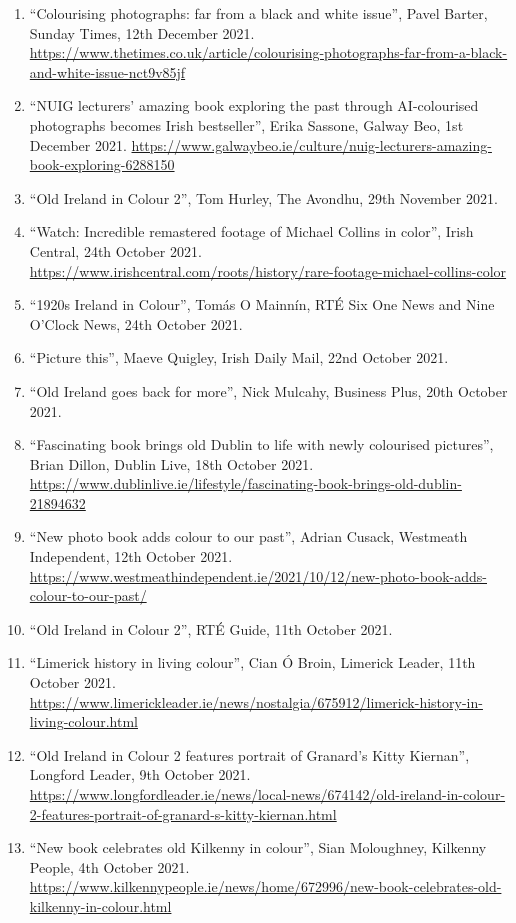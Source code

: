 \documentclass[10pt,a4paper]{res} %
\begin{document}
\begin{resume}
{\begin{enumerate}
\item ``Colourising photographs: far from a black and white issue'', Pavel Barter, Sunday Times, 12th December 2021. \url{https://www.thetimes.co.uk/article/colourising-photographs-far-from-a-black-and-white-issue-nct9v85jf}
\item ``NUIG lecturers' amazing book exploring the past through AI-colourised photographs becomes Irish bestseller'', Erika Sassone, Galway Beo, 1st December 2021. \url{https://www.galwaybeo.ie/culture/nuig-lecturers-amazing-book-exploring-6288150}
\item ``Old Ireland in Colour 2'', Tom Hurley, The Avondhu, 29th November 2021.
\item ``Watch: Incredible remastered footage of Michael Collins in color'', Irish Central, 24th October 2021. \url{https://www.irishcentral.com/roots/history/rare-footage-michael-collins-color}
\item ``1920s Ireland in Colour'', Tom\'{a}s O Mainn\'{i}n, RT\'{E} Six One News and Nine O'Clock News, 24th October 2021.
\item ``Picture this'', Maeve Quigley, Irish Daily Mail, 22nd October 2021.
\item ``Old Ireland goes back for more'', Nick Mulcahy, Business Plus, 20th October 2021.
\item ``Fascinating book brings old Dublin to life with newly colourised pictures'', Brian Dillon, Dublin Live, 18th October 2021. \url{https://www.dublinlive.ie/lifestyle/fascinating-book-brings-old-dublin-21894632}
\item ``New photo book adds colour to our past'', Adrian Cusack, Westmeath Independent, 12th October 2021. \url{https://www.westmeathindependent.ie/2021/10/12/new-photo-book-adds-colour-to-our-past/}
\item ``Old Ireland in Colour 2'', RT\'{E} Guide, 11th October 2021.
\item ``Limerick history in living colour'', Cian \'{O} Broin, Limerick Leader, 11th October 2021. \url{https://www.limerickleader.ie/news/nostalgia/675912/limerick-history-in-living-colour.html}
\item ``Old Ireland in Colour 2 features portrait of Granard's Kitty Kiernan'', Longford Leader, 9th October 2021. \url{https://www.longfordleader.ie/news/local-news/674142/old-ireland-in-colour-2-features-portrait-of-granard-s-kitty-kiernan.html}
\item ``New book celebrates old Kilkenny in colour'', Sian Moloughney, Kilkenny People, 4th October 2021. \url{https://www.kilkennypeople.ie/news/home/672996/new-book-celebrates-old-kilkenny-in-colour.html}

\end{enumerate}}
\end{resume}
\end{document}
